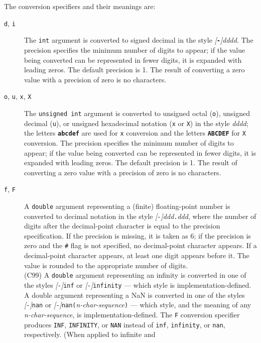 The conversion specifiers and their meanings are:
\begin{description}
	\item[\texttt{d}, \texttt{i}] The \texttt{int} argument is converted to
signed decimal in the style \emph{[}\texttt{\textbf{-}}\emph{]dddd}. The
precision specifies the minimum number of digits to appear; if the value being
converted can be represented in fewer digits, it is expanded with leading
zeros. The default precision is 1. The result of converting a zero value with a
precision of zero is no characters.
	\item[\texttt{o}, \texttt{u}, \texttt{x}, \texttt{X}] The \texttt{unsigned
int} argument is converted to unsigned octal (\texttt{o}), unsigned decimal
(\texttt{u}), or unsigned hexadecimal notation (\texttt{x} or \texttt{X}) in
the style \emph{dddd}; the letters \texttt{\textbf{abcdef}} are used for
\texttt{x} conversion and the letters \texttt{\textbf{ABCDEF}} for \texttt{X}
conversion. The precision specifies the minimum number of digits to appear; if
the value being converted can be represented in fewer digits, it is expanded
with leading zeros. The default precision is 1. The result of converting a zero
value with a precision of zero is no characters.
	\item[\texttt{f}, \texttt{F}] A \texttt{double} argument representing a
(finite) floating-point number is converted to decimal notation in the style
\emph{[}\texttt{-}\emph{]ddd}\texttt{.}\emph{ddd}, where the number of digits
after the decimal-point character is equal to the precision specification. If
the precision is missing, it is taken as 6; if the precision is zero and the
\texttt{\#} flag is not specified, no decimal-point character appears. If a
decimal-point character appears, at least one digit appears before it. The
value is rounded to the appropriate number of digits.\\(C99) A \texttt{double}
argument representing an infinity is converted in one of the styles
\emph{[}\texttt{-}\emph{]}\texttt{inf} or
\emph{[}\texttt{-}\emph{]}\texttt{infinity} --- which style is
implementation-defined. A double argument representing a NaN is converted in
one of the styles \emph{[}\texttt{-}\emph{]}\texttt{nan} or
\emph{[}\texttt{-}\emph{]}\texttt{nan(}\emph{n-char-sequence}\texttt{)} ---
which style, and the meaning of any \emph{n-char-sequence}, is
implementation-defined. The \texttt{F} conversion specifier produces
\texttt{INF}, \texttt{INFINITY}, or \texttt{NAN} instead of \texttt{inf},
\texttt{infinity}, or \texttt{nan}, respectively. (When applied to infinite and

\end{description}
